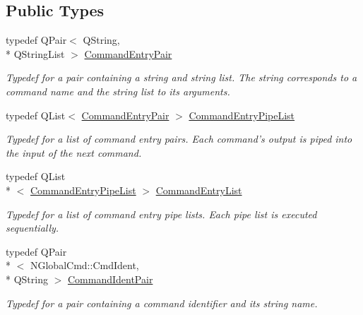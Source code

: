 \subsection*{Public Types}
\begin{DoxyCompactItemize}
\item 
\hypertarget{class_command_interpreter_ac3d555ea1cd2452a773a7d9910c0a7a2}{typedef Q\-Pair$<$ Q\-String, \\*
Q\-String\-List $>$ \hyperlink{class_command_interpreter_ac3d555ea1cd2452a773a7d9910c0a7a2}{Command\-Entry\-Pair}}\label{class_command_interpreter_ac3d555ea1cd2452a773a7d9910c0a7a2}

\begin{DoxyCompactList}\small\item\em Typedef for a pair containing a string and string list. The string corresponds to a command name and the string list to its arguments. \end{DoxyCompactList}\item 
\hypertarget{class_command_interpreter_ab3e2b529b3b064432271873542973cd0}{typedef Q\-List$<$ \hyperlink{class_command_interpreter_ac3d555ea1cd2452a773a7d9910c0a7a2}{Command\-Entry\-Pair} $>$ \hyperlink{class_command_interpreter_ab3e2b529b3b064432271873542973cd0}{Command\-Entry\-Pipe\-List}}\label{class_command_interpreter_ab3e2b529b3b064432271873542973cd0}

\begin{DoxyCompactList}\small\item\em Typedef for a list of command entry pairs. Each command's output is piped into the input of the next command. \end{DoxyCompactList}\item 
\hypertarget{class_command_interpreter_a8b935bf4840835a8ab5f99756268d113}{typedef Q\-List\\*
$<$ \hyperlink{class_command_interpreter_ab3e2b529b3b064432271873542973cd0}{Command\-Entry\-Pipe\-List} $>$ \hyperlink{class_command_interpreter_a8b935bf4840835a8ab5f99756268d113}{Command\-Entry\-List}}\label{class_command_interpreter_a8b935bf4840835a8ab5f99756268d113}

\begin{DoxyCompactList}\small\item\em Typedef for a list of command entry pipe lists. Each pipe list is executed sequentially. \end{DoxyCompactList}\item 
\hypertarget{class_command_interpreter_acef7360cdc3e98c4d35ec54954c4e39c}{typedef Q\-Pair\\*
$<$ N\-Global\-Cmd\-::\-Cmd\-Ident, \\*
Q\-String $>$ \hyperlink{class_command_interpreter_acef7360cdc3e98c4d35ec54954c4e39c}{Command\-Ident\-Pair}}\label{class_command_interpreter_acef7360cdc3e98c4d35ec54954c4e39c}

\begin{DoxyCompactList}\small\item\em Typedef for a pair containing a command identifier and its string name. \end{DoxyCompactList}\end{DoxyCompactItemize}
